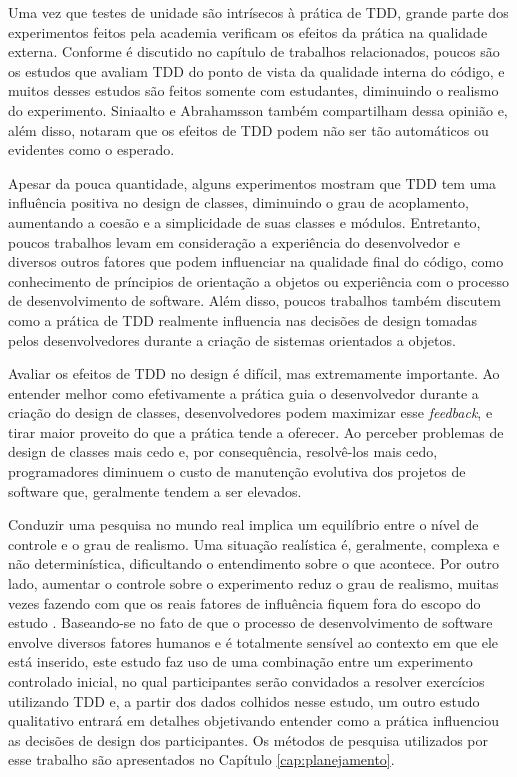 Uma vez que testes de unidade são intrísecos à prática de TDD, 
grande parte dos experimentos feitos pela academia verificam os
efeitos da prática na qualidade externa. Conforme é discutido no capítulo de
trabalhos relacionados, poucos são os estudos que avaliam TDD do
ponto de vista da qualidade interna do código, e muitos desses estudos
são feitos somente com estudantes, diminuindo o realismo do experimento. 
Siniaalto e Abrahamsson \cite{alarming-results} também
compartilham dessa opinião e, além disso, notaram que os efeitos de TDD podem 
não ser tão automáticos ou evidentes como o esperado.

Apesar da pouca quantidade, alguns experimentos mostram que TDD tem uma influência
positiva no design de classes, diminuindo o grau de acoplamento, aumentando
a coesão e a simplicidade de suas classes e módulos. Entretanto, poucos trabalhos
levam em consideração a experiência do desenvolvedor e diversos
outros fatores que podem influenciar na qualidade final do código, como conhecimento
de príncipios de orientação a objetos ou experiência com o processo de 
desenvolvimento de software. Além disso, poucos trabalhos também discutem como
a prática de TDD realmente influencia 
nas decisões de design tomadas pelos desenvolvedores durante a criação de sistemas 
orientados a objetos.

Avaliar os efeitos de TDD no design é difícil, mas extremamente importante.
Ao entender melhor como efetivamente a prática guia o desenvolvedor durante
a criação do design de classes, desenvolvedores podem maximizar esse \textit{feedback},
e tirar maior proveito do que a prática tende a oferecer. Ao perceber 
problemas de design de classes mais cedo e, por consequência, resolvê-los
mais cedo, programadores diminuem o custo de manutenção evolutiva dos projetos
de software que, geralmente tendem a ser elevados.

Conduzir uma pesquisa no mundo real implica um equilíbrio entre o nível de controle
e o grau de realismo. Uma situação realística é, geralmente, complexa e 
não determinística, dificultando o entendimento sobre o que acontece. Por outro
lado, aumentar o controle sobre o experimento reduz o grau de realismo, muitas
vezes fazendo com que os reais fatores de influência fiquem fora do escopo do 
estudo \cite{guidelines-case-study}.
Baseando-se no fato de que o processo de desenvolvimento de software envolve 
diversos fatores humanos e é totalmente sensível ao contexto em que ele está 
inserido, 
este estudo faz uso de uma combinação entre um experimento controlado inicial, 
no qual participantes serão convidados a resolver exercícios utilizando TDD e, 
a partir dos dados colhidos nesse estudo, um outro estudo qualitativo entrará em 
detalhes objetivando entender como a prática influenciou as decisões de design 
dos participantes. Os métodos de pesquisa utilizados por
esse trabalho são apresentados no Capítulo \ref{cap:planejamento}.

